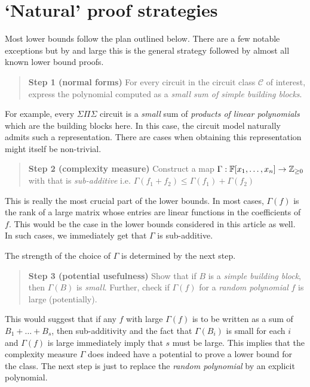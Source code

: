 \documentclass{beatcs}
\begin{document}
\section{`Natural' proof strategies}\label{sec:natural-proofs}

Most lower bounds follow the plan outlined below. There are a few notable exceptions but by and large this is the general strategy followed by almost all known lower bound proofs. 

\begin{quote}
{\bf Step 1 (normal forms)} For every circuit in the circuit class $\mathcal{C}$ of interest, express the polynomial computed as a \emph{small sum of simple building blocks}. 
\end{quote}

For example, every $\Sigma\Pi\Sigma$ circuit is a \emph{small} sum of \emph{products of linear polynomials} which are the building blocks here. In this case, the circuit model naturally admits such a representation. There are cases when obtaining this representation might itself be non-trivial. 

\begin{quote}
{\bf Step 2 (complexity measure)} Construct a map $\Gamma: \mathbb{F}[x_1,\dots, x_n] \rightarrow \mathbb{Z}_{\geq 0}$ with that is \emph{sub-additive} i.e. $\Gamma(f_1 + f_2)\leq \Gamma(f_1) + \Gamma(f_2)$
\end{quote}

This is really the most crucial part of the lower bounds. In most cases, $\Gamma(f)$ is the rank of a large matrix whose entries are linear functions in the coefficients of $f$. This would be the case in the lower bounds considered in this article as well. In such cases, we immediately get that $\Gamma$ is sub-additive. 

The strength of the choice of $\Gamma$ is determined by the next step. 

\begin{quote}
{\bf Step 3 (potential usefulness)} Show that if $B$ is a \emph{simple building block}, then $\Gamma(B)$ is \emph{small}.
Further, check if $\Gamma(f)$ for a \emph{random polynomial} $f$ is large (potentially). 
\end{quote}

This would suggest that if any $f$ with large $\Gamma(f)$ is to be written as a sum of $B_1 + \dots + B_s$, then sub-additivity and the fact that $\Gamma(B_i)$ is small for each $i$ and $\Gamma(f)$ is large immediately imply that $s$ must be large. This implies that the complexity measure $\Gamma$ does indeed have a potential to prove a lower bound for the class. The next step is just to replace the \emph{random polynomial} by an explicit polynomial. 
\end{document}
